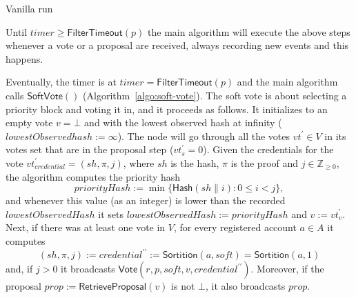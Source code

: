 \documentclass[10pt,a4paper]{article}
\begin{document}
\begin{section}{Vanilla run}
    
    
    Until $timer\ge \mathsf{FilterTimeout}(p)$ the main algorithm will execute the above steps
    whenever a vote or a proposal are received, always recording new events and this happens.
    
    Eventually, the timer is at $timer=\mathsf{FilterTimeout}(p)$ and the main algorithm calls 
    $\mathsf{SoftVote()}$ (Algorithm~\ref{algo:soft-vote}).
    The soft vote is about selecting a priority block and voting it in, and it proceeds as follows.
    It initializes to an empty vote $v=\bot$ and with the lowest observed hash at infinity ($lowestObservedhash:=\infty$).
    The node will go through all the votes $vt^\prime\in V$ in its votes set that are in the
    proposal step ($vt^\prime_s=0$).
    Given the credentials for the vote $vt^\prime_{credential}=(sh,\pi, j)$, where $sh$ is the hash,
    $\pi$ is the proof and $j\in\mathbb{Z}_{\geq 0}$, the algorithm computes the priority hash
    $$
    priorityHash:=\min\{\mathsf{Hash}(sh\| i): 0\le i<j\},
    $$
    and whenever this value (as an integer) is lower than the recorded 
    $lowestObservedHash$ it sets 
    $lowestObservedHash:=priorityHash$ and $v:=vt^\prime_v$.
    Next, if there was at least one vote in $V$, for every registered account $a\in A$
    it computes 
    $$
    (sh,\pi,j):=credential^{\prime\prime}:=\mathsf{Sortition}(a,soft)=\mathsf{Sortition}(a,1)
    $$
    and, if $j>0$ it broadcasts $\mathsf{Vote}(r,p,soft,v,credential^{\prime\prime})$.
    Moreover, if the proposal $prop:=\mathsf{RetrieveProposal}(v)$ is not $\bot$, it also broadcasts $prop$.
    

\end{section}
\end{document}
